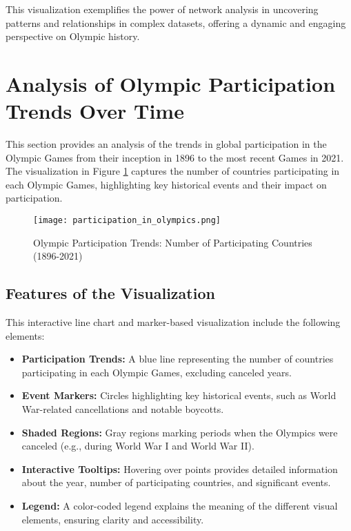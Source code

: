 This visualization exemplifies the power of network analysis in uncovering patterns and relationships in complex datasets, offering a dynamic and engaging perspective on Olympic history.

\section{Analysis of Olympic Participation Trends Over Time}

This section provides an analysis of the trends in global participation in the Olympic Games from their inception in 1896 to the most recent Games in 2021. The visualization in Figure \ref{fig:olympic_participation_trends} captures the number of countries participating in each Olympic Games, highlighting key historical events and their impact on participation.

\begin{figure}[ht]
    \centering
    \texttt{[image: participation\_in\_olympics.png]}
    \caption{Olympic Participation Trends: Number of Participating Countries (1896-2021)}
    \label{fig:olympic_participation_trends}
\end{figure}

\subsection{Features of the Visualization}

This interactive line chart and marker-based visualization include the following elements:
\begin{itemize}
    \item \textbf{Participation Trends:} A blue line representing the number of countries participating in each Olympic Games, excluding canceled years.
    \item \textbf{Event Markers:} Circles highlighting key historical events, such as World War-related cancellations and notable boycotts.
    \item \textbf{Shaded Regions:} Gray regions marking periods when the Olympics were canceled (e.g., during World War I and World War II).
    \item \textbf{Interactive Tooltips:} Hovering over points provides detailed information about the year, number of participating countries, and significant events.
    \item \textbf{Legend:} A color-coded legend explains the meaning of the different visual elements, ensuring clarity and accessibility.
\end{itemize}

